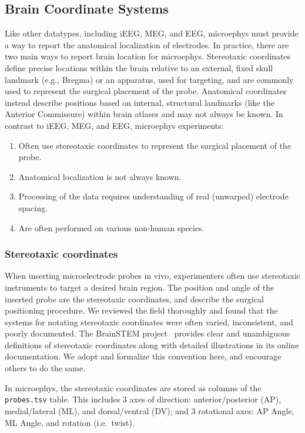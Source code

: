 \documentclass[fleqn,10pt]{article}
\begin{document}
\subsection*{Brain Coordinate Systems}\label{sec:coordinate-systems}

Like other datatypes, including iEEG, MEG, and EEG, microephys must provide a way to report the anatomical localization of electrodes. In practice, there are two main ways to report brain location for microephys. Stereotaxic coordinates define precise locations within the brain relative to an external, fixed skull landmark (e.g., Bregma) or an apparatus, used for targeting, and are commonly used to represent the surgical placement of the probe. Anatomical coordinates instead describe positions based on internal, structural landmarks (like the Anterior Commissure) within brain atlases and may not always be known. In contrast to iEEG, MEG, and EEG, microephys experiments:
\begin{enumerate}[noitemsep]
	\item Often use stereotaxic coordinates to represent the surgical placement of the probe.
	\item Anatomical localization is not always known.
	\item Processing of the data requires understanding of real (unwarped) electrode spacing.
	\item Are often performed on various non-human species.
\end{enumerate}

\subsubsection*{Stereotaxic coordinates}\label{sec:stereotaxic}

When inserting microelectrode probes in vivo, experimenters often use stereotaxic instruments to target a desired brain region.
The position and angle of the inserted probe are the stereotaxic coordinates, and describe the surgical positioning procedure.
We reviewed the field thoroughly and found that the systems for notating stereotaxic coordinates were often varied, inconsistent, and poorly documented.
The BrainSTEM project~\citep{petersen_brainstem} provides clear and unambiguous definitions of stereotaxic coordinates along with detailed illustrations in its online documentation.
We adopt and formalize this convention here, and encourage others to do the same.

In microephys, the stereotaxic coordinates are stored as columns of the \texttt{probes.tsv} table.
This includes 3 axes of direction: anterior/posterior (AP), medial/lateral (ML), and dorsal/ventral (DV); and 3 rotational axes: AP Angle, ML Angle, and rotation (i.e.\ twist).
\end{document}
